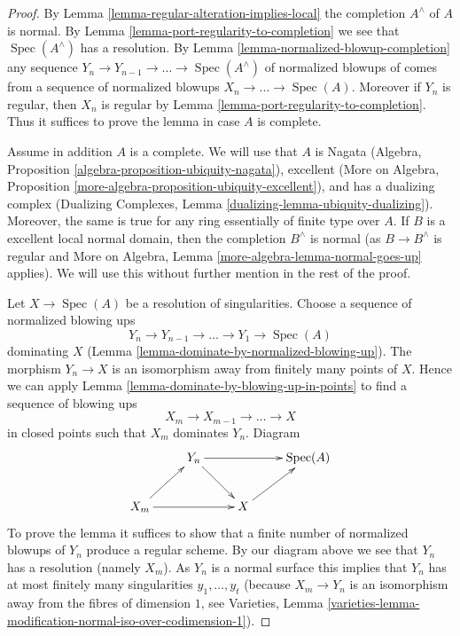 \documentclass[10pt,a4paper]{amsart}
\theoremstyle{plain}
\theoremstyle{definition}
\theoremstyle{remark}
\numberwithin{equation}{subsection}
\def\Spec{\mathop{\mathrm{Spec}}}
\begin{document}
\begin{proof}
By Lemma \ref{lemma-regular-alteration-implies-local}
the completion $A^\wedge$ of $A$ is normal.
By Lemma \ref{lemma-port-regularity-to-completion} we see
that $\Spec(A^\wedge)$ has a resolution.
By Lemma \ref{lemma-normalized-blowup-completion}
any sequence $Y_n \to Y_{n - 1} \to \ldots \to \Spec(A^\wedge)$
of normalized blowups of comes from a sequence of normalized
blowups $X_n \to \ldots \to \Spec(A)$. Moreover if $Y_n$ is
regular, then $X_n$ is regular by
Lemma \ref{lemma-port-regularity-to-completion}.
Thus it suffices to prove the lemma in case $A$ is complete.

\medskip\noindent
Assume in addition $A$ is a complete. We will use that $A$ is Nagata
(Algebra, Proposition \ref{algebra-proposition-ubiquity-nagata}),
excellent (More on Algebra, Proposition
\ref{more-algebra-proposition-ubiquity-excellent}),
and has a dualizing complex
(Dualizing Complexes, Lemma \ref{dualizing-lemma-ubiquity-dualizing}).
Moreover, the same is true for any ring essentially of finite type over $A$.
If $B$ is a excellent local normal domain, then the completion
$B^\wedge$ is normal (as $B \to B^\wedge$ is regular and
More on Algebra, Lemma \ref{more-algebra-lemma-normal-goes-up} applies).
We will use this without further mention in the rest of the proof.

\medskip\noindent
Let $X \to \Spec(A)$ be a resolution of singularities.
Choose a sequence of normalized blowing ups
$$
Y_n \to Y_{n - 1} \to \ldots \to Y_1 \to \Spec(A)
$$
dominating $X$ (Lemma \ref{lemma-dominate-by-normalized-blowing-up}).
The morphism $Y_n \to X$ is an isomorphism away from
finitely many points of $X$.
Hence we can apply Lemma \ref{lemma-dominate-by-blowing-up-in-points}
to find a sequence of blowing ups
$$
X_m \to X_{m - 1} \to \ldots \to X
$$
in closed points such that $X_m$ dominates $Y_n$. Diagram
$$
\xymatrix{
& Y_n \ar[rd] \ar[rr] & & \Spec(A) \\
X_m \ar[rr] \ar[ru] & & X \ar[ru]
}
$$
To prove the lemma it suffices to show that a finite number of normalized
blowups of $Y_n$ produce a regular scheme. By our diagram above we see that
$Y_n$ has a resolution (namely $X_m$). As $Y_n$ is a normal surface
this implies that $Y_n$ has at most finitely many singularities
$y_1, \ldots, y_t$ (because $X_m \to Y_n$ is an isomorphism away from
the fibres of dimension $1$, see Varieties, Lemma
\ref{varieties-lemma-modification-normal-iso-over-codimension-1}).


\end{proof}
\end{document}
